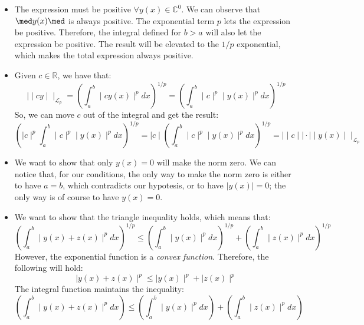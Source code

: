 \begin{itemize}
    \item The expression must be positive $\forall y(x) \in \mathbb{C}^0$. We can observe that $\med y(x) \med$ is always positive. The exponential term $p$ lets the expression be positive. Therefore, the integral defined for $b > a$ will also let the expression be positive. The result will be elevated to the $1/p$ exponential, which makes the total expression always positive.
    \item Given $c \in \mathbb{R}$, we have that:
    \begin{equation}
        \mid\mid cy \mid \mid _{\mathcal{L}_p} = \left( \int_a^b \mid c y(x) \mid ^p dx \right) ^{1/p} =  \left( \int_a^b \mid c \mid ^p  \mid y(x) \mid ^p dx \right) ^{1/p}
    \end{equation}
    So, we can move $c$ out of the integral and get the result:
    \begin{equation}
        \left( \mid c \mid ^p  \int_a^b \mid c \mid ^p  \mid y(x) \mid ^p dx \right) ^{1/p} = \mid c \mid \left( \int_a^b \mid c \mid ^p  \mid y(x) \mid ^p dx \right) ^{1/p} = \mid \mid c \mid \mid \cdot \mid \mid y(x)\mid \mid_{\mathcal{L}_p} 
    \end{equation}
    \item We want to show that only $y(x) = 0$ will make the norm zero. We can notice that, for our conditions, the only way to make the norm zero is either to have $a = b$, which contradicts our hypotesis, or to have $\mid y(x) \mid = 0$; the only way is of course to have $y(x) = 0$.
    \item We want to show that the triangle inequality holds, which means that:
    \begin{equation}
        \left( \int_a^b \mid y(x) + z(x) \mid ^p dx \right) ^{1/p} \leq \left( \int_a^b \mid y(x) \mid ^p dx \right) ^{1/p} + \left( \int_a^b \mid z(x) \mid ^p dx \right) ^{1/p}
    \end{equation}
    However, the exponential function is a \emph{convex function}. Therefore, the following will hold:
    \begin{equation}
        \mid y(x) + z(x) \mid ^p  \leq \mid y(x)  \mid ^p  + \mid z(x) \mid ^p 
    \end{equation}
    The integral function maintains the inequality:
    \begin{equation}
        \left( \int_a^b \mid y(x) + z(x) \mid ^p dx \right) \leq \left( \int_a^b \mid y(x) \mid ^p dx \right) + \left( \int_a^b \mid z(x) \mid ^p dx \right)

\end{equation}
\end{itemize}
